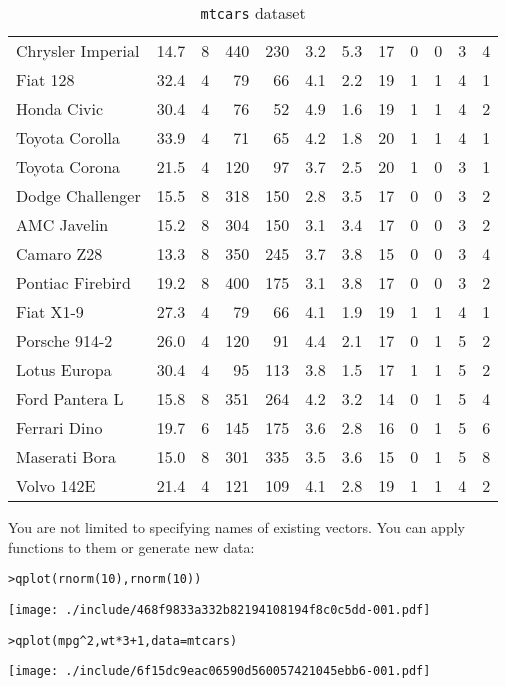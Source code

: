 \begin{table}[ht]
\begin{center}
\begin{tabular}{l|rrrrrrrrrrr}
Chrysler Imperial & 14.7 & 8 & 440 & 230 & 3.2 & 5.3 & 17 & 0 & 0 & 3 & 4 \\
Fiat 128 & 32.4 & 4 & 79 & 66 & 4.1 & 2.2 & 19 & 1 & 1 & 4 & 1 \\
Honda Civic & 30.4 & 4 & 76 & 52 & 4.9 & 1.6 & 19 & 1 & 1 & 4 & 2 \\
Toyota Corolla & 33.9 & 4 & 71 & 65 & 4.2 & 1.8 & 20 & 1 & 1 & 4 & 1 \\
Toyota Corona & 21.5 & 4 & 120 & 97 & 3.7 & 2.5 & 20 & 1 & 0 & 3 & 1 \\
Dodge Challenger & 15.5 & 8 & 318 & 150 & 2.8 & 3.5 & 17 & 0 & 0 & 3 & 2 \\
AMC Javelin & 15.2 & 8 & 304 & 150 & 3.1 & 3.4 & 17 & 0 & 0 & 3 & 2 \\
Camaro Z28 & 13.3 & 8 & 350 & 245 & 3.7 & 3.8 & 15 & 0 & 0 & 3 & 4 \\
Pontiac Firebird & 19.2 & 8 & 400 & 175 & 3.1 & 3.8 & 17 & 0 & 0 & 3 & 2 \\
Fiat X1-9 & 27.3 & 4 & 79 & 66 & 4.1 & 1.9 & 19 & 1 & 1 & 4 & 1 \\
Porsche 914-2 & 26.0 & 4 & 120 & 91 & 4.4 & 2.1 & 17 & 0 & 1 & 5 & 2 \\
Lotus Europa & 30.4 & 4 & 95 & 113 & 3.8 & 1.5 & 17 & 1 & 1 & 5 & 2 \\
Ford Pantera L & 15.8 & 8 & 351 & 264 & 4.2 & 3.2 & 14 & 0 & 1 & 5 & 4 \\
Ferrari Dino & 19.7 & 6 & 145 & 175 & 3.6 & 2.8 & 16 & 0 & 1 & 5 & 6 \\
Maserati Bora & 15.0 & 8 & 301 & 335 & 3.5 & 3.6 & 15 & 0 & 1 & 5 & 8 \\
Volvo 142E & 21.4 & 4 & 121 & 109 & 4.1 & 2.8 & 19 & 1 & 1 & 4 & 2 \\
\hline
\end{tabular}
\caption{{\tt mtcars} dataset}
\label{tab:mtcars}
\end{center}
\end{table}%
\clearpage

You are not limited to specifying names of existing vectors.  You can apply functions to them or generate new data:

\begin{alltt}
> qplot(rnorm(10), rnorm(10))
\end{alltt}
\texttt{[image: ./include/468f9833a332b82194108194f8c0c5dd-001.pdf]}
\begin{alltt}
> qplot(mpg^2, wt * 3 + 1, data = mtcars)
\end{alltt}
\texttt{[image: ./include/6f15dc9eac06590d560057421045ebb6-001.pdf]}
\begin{alltt}\end{alltt}%

